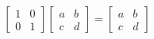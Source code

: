 \documentclass[preview]{standalone}
\begin{document}
\begin{align*}
\begin{bmatrix} 1 & 0 \\ 0 & 1 \end{bmatrix} \begin{bmatrix} a & b \\ c & d \end{bmatrix}  =  \begin{bmatrix} a & b \\ c & d \end{bmatrix}
\end{align*}
\end{document}
